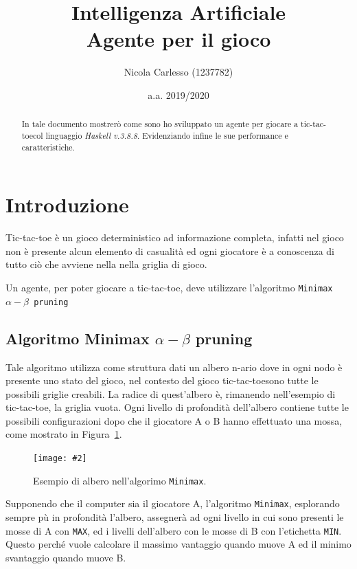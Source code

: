 \documentclass[11pt, a4paper]{article}
\title{Intelligenza Artificiale\\ Agente per il gioco \tic}
\author{Nicola Carlesso (1237782)}
\date{a.a. 2019/2020}
\newcommand{\tic}{tic-tac-toe}
\newcommand{\image}[4]{
	\begin{figure}[H]
		\centering
		\texttt{[image: \#2]}
		\caption{#3.}
		\label{#4}
	\end{figure}
}
\begin{document}
	
	\begin{titlepage}
		\maketitle
		\BgThispage
	\end{titlepage}
	
	\begin{abstract}
		In tale documento mostrerò come sono ho sviluppato un agente per giocare a \tic col linguaggio \textit{Haskell v.3.8.8}. Evidenziando infine le sue performance e caratteristiche.
	\end{abstract}

\section{Introduzione}
Tic-tac-toe è un gioco deterministico ad informazione completa, infatti nel gioco non è presente alcun elemento di casualità ed ogni giocatore è a conoscenza di tutto ciò che avviene nella nella griglia di gioco.

Un agente, per poter giocare a \tic, deve utilizzare l'algoritmo \texttt{Minimax $\alpha-\beta$ pruning}

\subsection{Algoritmo Minimax $\alpha-\beta$ pruning}
Tale algoritmo utilizza come struttura dati un albero n-ario dove in ogni nodo è presente uno stato del gioco, nel contesto del gioco \tic sono tutte le possibili griglie creabili. La radice di quest'albero è, rimanendo nell'esempio di \tic, la griglia vuota. Ogni livello di profondità dell'albero contiene tutte le possibili configurazioni dopo che il giocatore A o B hanno effettuato una mossa, come mostrato in Figura~\ref{tree}.

\image{0.5}{tree}{Esempio di albero nell'algorimo \texttt{Minimax}}{tree}

Supponendo che il computer sia il giocatore A, l'algoritmo \texttt{Minimax}, esplorando sempre pù in profondità l'albero, assegnerà ad ogni livello in cui sono presenti le mosse di A con \texttt{MAX}, ed i livelli dell'albero con le mosse di B con l'etichetta \texttt{MIN}. Questo perché vuole calcolare il massimo vantaggio quando muove A ed il minimo svantaggio quando muove B.
\end{document}
